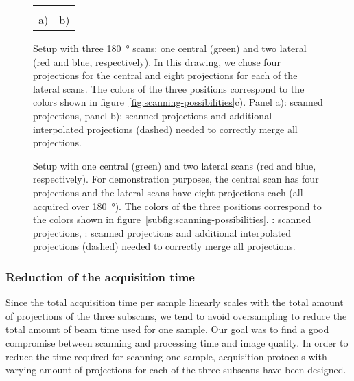 \ifiucr
	\begin{figure}%
		\caption{Setup with three \SI{180}{\degree} scans; one central (green) and two lateral (red and blue, respectively). In this drawing, we chose four projections for the central and eight projections for each of the lateral scans. The colors of the three positions correspond to the colors shown in figure~\ref{fig:scanning-possibilities}c). Panel a): scanned projections, panel b): scanned projections and additional interpolated projections (dashed) needed to correctly merge all projections.}%
		\begin{tabular}{cc}%
		&%
		\\%
		a) & b)\\%
		\end{tabular}%
		\label{fig:projections}%
	\end{figure}%
\else
	\begin{figure*}[htp]
		\centering
		\subfloat[]{%
			\label{subfig:ProjectionSetup}%
			}%
		\subfloat[]{%
			\label{subfig:ProjectionSetupInterpolate}%
			}%
		\caption{Setup with one central (green) and two lateral scans (red and blue, respectively). For demonstration purposes, the central scan has four projections and the lateral scans have eight projections each (all acquired over \SI{180}{\degree}). The colors of the three positions correspond to the colors shown in figure~\ref{subfig:scanning-possibilities}. : scanned projections, : scanned projections and additional interpolated projections (dashed) needed to correctly merge all projections.}
		\label{fig:projections}
	\end{figure*}
\fi

\subsubsection{Reduction of the acquisition time}%
Since the total acquisition time per sample linearly scales with the total amount of projections of the three subscans, we tend to avoid oversampling to reduce the total amount of beam time used for one sample. Our goal was to find a good compromise between scanning and processing time and image quality. In order to reduce the time required for scanning one sample, acquisition protocols with varying amount of projections for each of the three subscans have been designed.

